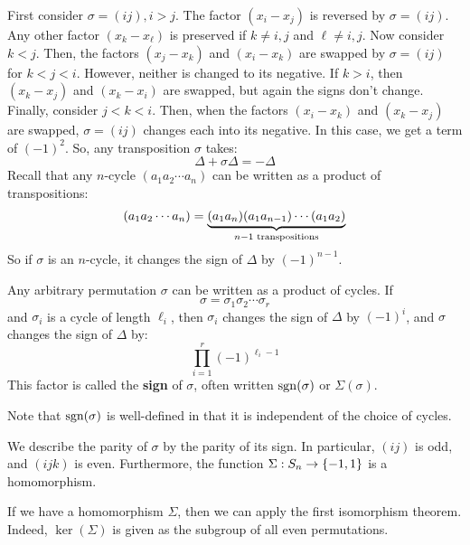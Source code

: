 First consider $ \sigma = (ij), i > j $.
The factor $ (x_{i} - x_{j}) $ is reversed by $ \sigma = (ij) $.
Any other factor $ (x_{k} - x_{\ell}) $ is preserved if $ k \neq i, j $ and $ \ell \neq i, j $. \vsp
%
Now consider $ k < j $.
Then, the factors $ (x_{j} - x_{k}) $ and $ (x_{i} - x_{k}) $ are swapped by $ \sigma = (ij) $
for $ k < j < i $. However, neither is changed to its negative. \vsp
%
If $ k > i $, then $ (x_{k} - x_{j}) $ and $ (x_{k} - x_{i}) $ are swapped, but again the signs
don't change. \vsp
%
Finally, consider $ j < k < i $.
Then, when the factors $ (x_{i} - x_{k}) $ and $ (x_{k} - x_{j}) $ are swapped,
$ \sigma = (ij) $ changes each into its negative. In this case, we get a term of $ (-1)^{2} $.
So, any transposition $ \sigma $ takes:
\begin{equation*}
    \Delta + \sigma\Delta = -\Delta
\end{equation*}
Recall that any $ n $-cycle $ (a_{1}a_{2}\cdots a_{n}) $ can be
written as a product of transpositions:
\begin{equation*}
    (a_{1}a_{2}\cdots a_{n}) = \underbrace{(a_{1}a_{n})(a_{1}a_{n-1})\cdots(a_{1}a_{2})}
    _{n - 1 \textrm{ transpositions}}
\end{equation*}
So if $ \sigma $ is an $ n $-cycle, it changes the sign of $ \Delta $ by $ (-1)^{n-1} $.

\begin{defn}
    Any arbitrary permutation $ \sigma $ can be written as a product of cycles. If
    \begin{equation*}
        \sigma = \sigma_{1}\sigma_{2}\cdots \sigma_{r}
    \end{equation*}
    and $ \sigma_{i} $ is a cycle of length $ \ell_{i} $, then $ \sigma_{i} $ changes the
    sign of $ \Delta $ by $ (-1)^{i} $, and $ \sigma $ changes the sign of $ \Delta $ by:
    \begin{equation*}
        \prod_{i=1}^{r} (-1)^{\ell_{i}-1}
    \end{equation*}
    This factor is called the \textbf{sign} of $ \sigma $, often written $ \operatorname{sgn}(\sigma) $
    or $ \Sigma(\sigma) $.
\end{defn}
Note that $ \operatorname{sgn}(\sigma) $ is well-defined in that it is independent of the choice of cycles.

\newpage
\begin{crll}
    We describe the parity of $ \sigma $ by the parity of its sign. \vsp
    In particular, $ (ij) $ is odd, and $ (ijk) $ is even. \vsp
    Furthermore, the function $ \Sigma : S_{n} \rightarrow \left\{{-1, 1}\right\} $ is a homomorphism.
\end{crll}
If we have a homomorphism $ \Sigma $, then we can apply the first isomorphism theorem.
Indeed, $ \ker(\Sigma) $ is given as the subgroup of all even permutations.

